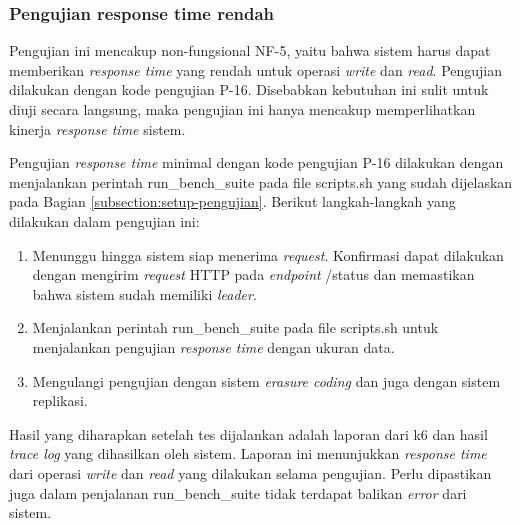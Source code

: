 \subsubsection{Pengujian response time rendah}
\label{subsubsection:pengujian-response-time-rendah}

Pengujian ini mencakup non-fungsional NF-5, yaitu bahwa sistem harus dapat memberikan \textit{response time} yang rendah untuk operasi \textit{write} dan \textit{read}. Pengujian dilakukan dengan kode pengujian P-16. Disebabkan kebutuhan ini sulit untuk diuji secara langsung, maka pengujian ini hanya mencakup memperlihatkan kinerja \textit{response time} sistem.

Pengujian \textit{response time} minimal dengan kode pengujian P-16 dilakukan dengan menjalankan perintah run\_bench\_suite pada file scripts.sh yang sudah dijelaskan pada Bagian \ref{subsection:setup-pengujian}. Berikut langkah-langkah yang dilakukan dalam pengujian ini:

\begin{enumerate}
	\item Menunggu hingga sistem siap menerima \textit{request}. Konfirmasi dapat dilakukan dengan mengirim \textit{request} HTTP pada \textit{endpoint} /status dan memastikan bahwa sistem sudah memiliki \textit{leader}.
	\item Menjalankan perintah run\_bench\_suite pada file scripts.sh untuk menjalankan pengujian \textit{response time} dengan ukuran data.
	\item Mengulangi pengujian dengan sistem \textit{erasure coding} dan juga dengan sistem replikasi.
\end{enumerate}

Hasil yang diharapkan setelah tes dijalankan adalah laporan dari k6 dan hasil \textit{trace log} yang dihasilkan oleh sistem. Laporan ini menunjukkan \textit{response time} dari operasi \textit{write} dan \textit{read} yang dilakukan selama pengujian. Perlu dipastikan juga dalam penjalanan run\_bench\_suite tidak terdapat balikan \textit{error} dari sistem.
